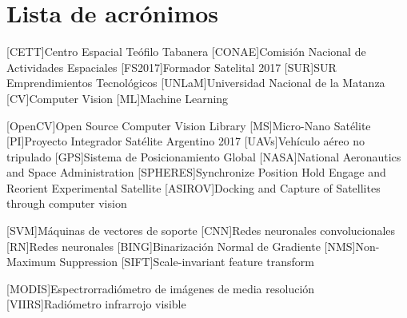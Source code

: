 \chapter*{Lista de acrónimos}
\label{chap:acronimos}

\begin{acronym}[SAOCOM]
[CETT]{Centro Espacial Teófilo Tabanera}
[CONAE]{Comisión Nacional de Actividades Espaciales}
[FS2017]{Formador Satelital 2017}
[SUR]{SUR Emprendimientos Tecnológicos}
[UNLaM]{Universidad Nacional de la Matanza}
[CV]{Computer Vision}
[ML]{Machine Learning}

[OpenCV]{Open Source Computer Vision Library}
[MS]{Micro-Nano Satélite}
[PI]{Proyecto Integrador Satélite Argentino 2017}
[UAVs]{Vehículo aéreo no tripulado}
[GPS]{Sistema de Posicionamiento Global}
[NASA]{National Aeronautics and Space Administration}
[SPHERES]{Synchronize Position Hold Engage and Reorient Experimental Satellite}
 [ASIROV]{Docking and Capture of Satellites through computer vision}

[SVM]{Máquinas de vectores de soporte}
[CNN]{Redes neuronales convolucionales}
[RN]{Redes neuronales}
[BING]{Binarización Normal de Gradiente}
[NMS]{Non-Maximum Suppression}
[SIFT]{Scale-invariant feature transform}

[MODIS]{Espectrorradiómetro de imágenes de media resolución}
[VIIRS]{Radiómetro infrarrojo visible}
\end{acronym}


